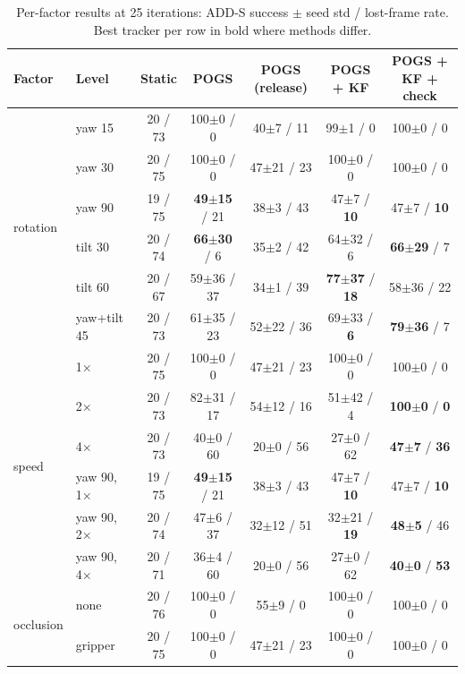 \documentclass[10pt,a4paper]{article}
\newcommand{\best}[1]{\textbf{#1}}
\begin{document}
\begin{table}[t]
\centering\footnotesize
\caption{Per-factor results at 25 iterations: ADD-S success $\pm$ seed std / lost-frame rate.
Best tracker per row in bold where methods differ.}
\label{tab:factors-res}
\setlength{\tabcolsep}{4pt}
\begin{tabular}{llccccc}
\toprule
Factor & Level & Static & POGS & POGS (release) & POGS + KF & POGS + KF + check \\
\midrule
\multirow{6}{*}{rotation}
 & yaw 15      & 20 / 73 & 100$\pm$0 / 0 & 40$\pm$7 / 11 & 99$\pm$1 / 0 & 100$\pm$0 / 0 \\
 & yaw 30      & 20 / 75 & 100$\pm$0 / 0 & 47$\pm$21 / 23 & 100$\pm$0 / 0 & 100$\pm$0 / 0 \\
 & yaw 90      & 19 / 75 & \best{49$\pm$15} / 21 & 38$\pm$3 / 43 & 47$\pm$7 / \best{10} & 47$\pm$7 / \best{10} \\
 & tilt 30     & 20 / 74 & \best{66$\pm$30} / 6 & 35$\pm$2 / 42 & 64$\pm$32 / 6 & \best{66$\pm$29} / 7 \\
 & tilt 60     & 20 / 67 & 59$\pm$36 / 37 & 34$\pm$1 / 39 & \best{77$\pm$37} / \best{18} & 58$\pm$36 / 22 \\
 & yaw+tilt 45 & 20 / 73 & 61$\pm$35 / 23 & 52$\pm$22 / 36 & 69$\pm$33 / \best{6} & \best{79$\pm$36} / 7 \\
\midrule
\multirow{6}{*}{speed}
 & 1$\times$   & 20 / 75 & 100$\pm$0 / 0 & 47$\pm$21 / 23 & 100$\pm$0 / 0 & 100$\pm$0 / 0 \\
 & 2$\times$   & 20 / 73 & 82$\pm$31 / 17 & 54$\pm$12 / 16 & 51$\pm$42 / 4 & \best{100$\pm$0} / \best{0} \\
 & 4$\times$   & 20 / 73 & 40$\pm$0 / 60 & 20$\pm$0 / 56 & 27$\pm$0 / 62 & \best{47$\pm$7} / \best{36} \\
 & yaw 90, 1$\times$ & 19 / 75 & \best{49$\pm$15} / 21 & 38$\pm$3 / 43 & 47$\pm$7 / \best{10} & 47$\pm$7 / \best{10} \\
 & yaw 90, 2$\times$ & 20 / 74 & 47$\pm$6 / 37 & 32$\pm$12 / 51 & 32$\pm$21 / \best{19} & \best{48$\pm$5} / 46 \\
 & yaw 90, 4$\times$ & 20 / 71 & 36$\pm$4 / 60 & 20$\pm$0 / 56 & 27$\pm$0 / 62 & \best{40$\pm$0} / \best{53} \\
\midrule
\multirow{4}{*}{occlusion}
 & none            & 20 / 76 & 100$\pm$0 / 0 & 55$\pm$9 / 0 & 100$\pm$0 / 0 & 100$\pm$0 / 0 \\
 & gripper         & 20 / 75 & 100$\pm$0 / 0 & 47$\pm$21 / 23 & 100$\pm$0 / 0 & 100$\pm$0 / 0 \\

\end{tabular}
\end{table}
\end{document}
